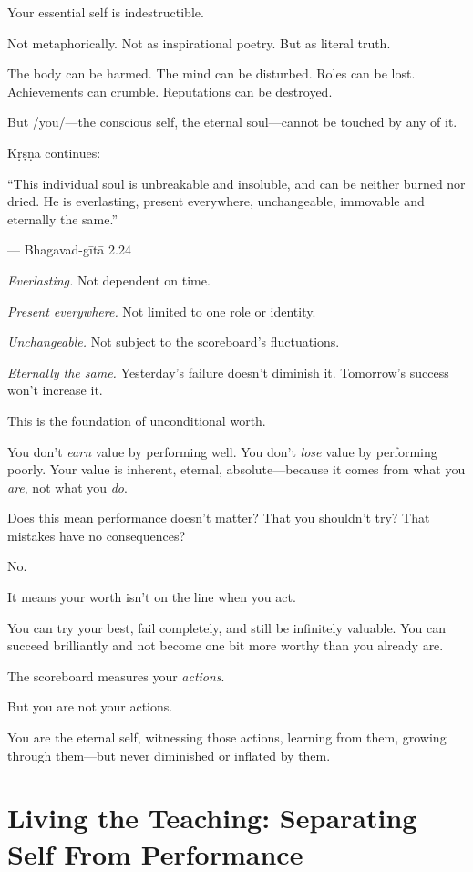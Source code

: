 \documentclass[11pt,twoside]{book}
\begin{document}
Your essential self is indestructible.

Not metaphorically. Not as inspirational poetry. But as literal truth.

The body can be harmed. The mind can be disturbed. Roles can be lost. Achievements can crumble. Reputations can be destroyed.

But /you/—the conscious self, the eternal soul—cannot be touched by any of it.

Kṛṣṇa continues:

\begin{pullquote}
``This individual soul is unbreakable and insoluble, and can be neither burned nor dried. He is everlasting, present everywhere, unchangeable, immovable and eternally the same.''

--- Bhagavad-gītā 2.24
\end{pullquote}

\emph{Everlasting.} Not dependent on time.

\emph{Present everywhere.} Not limited to one role or identity.

\emph{Unchangeable.} Not subject to the scoreboard's fluctuations.

\emph{Eternally the same.} Yesterday's failure doesn't diminish it. Tomorrow's success won't increase it.

This is the foundation of unconditional worth.

You don't \emph{earn} value by performing well. You don't \emph{lose} value by performing poorly. Your value is inherent, eternal, absolute—because it comes from what you \emph{are}, not what you \emph{do}.

Does this mean performance doesn't matter? That you shouldn't try? That mistakes have no consequences?

No.

It means your worth isn't on the line when you act.

You can try your best, fail completely, and still be infinitely valuable. You can succeed brilliantly and not become one bit more worthy than you already are.

The scoreboard measures your \emph{actions}.

But you are not your actions.

You are the eternal self, witnessing those actions, learning from them, growing through them—but never diminished or inflated by them.

\section*{Living the Teaching: Separating Self From Performance}
\end{document}
